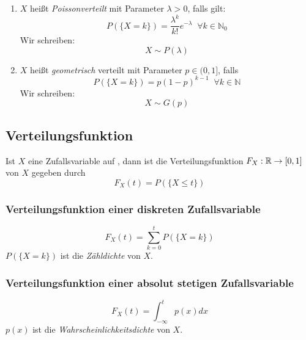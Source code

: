 \begin{enumerate}
    \item $X$ heißt \emph{Poissonverteilt} mit Parameter $\lambda > 0$, falls gilt:
          \begin{equation*}
              P(\{X=k\}) = \frac{\lambda^k}{k!} e^{-\lambda} \;\; \forall k\in \mathbb{N}_0
          \end{equation*}
          Wir schreiben:
          \begin{equation*}
              X \sim P(\lambda)
          \end{equation*}

    \item $X$ heißt \emph{geometrisch} verteilt mit Parameter $p \in (0,1]$, falls
          \begin{equation*}
              P(\{X=k\}) = p (1-p)^{k-1} \;\; \forall k \in \mathbb{N}
          \end{equation*}
          Wir schreiben:
          \begin{equation*}
              X \sim G(p)
          \end{equation*}
\end{enumerate}

\subsection{Verteilungsfunktion}

\begin{definition}[Verteilungsfunktion]
    Ist $X$ eine Zufallsvariable auf \wraum, dann ist die Verteilungsfunktion
    $F_X: \mathbb{R} \to [0,1]$ von $X$ gegeben durch
    \begin{equation*}
        F_X(t) = P(\{X \leq t\})
    \end{equation*}
\end{definition}

\subsubsection{Verteilungsfunktion einer diskreten Zufallsvariable}
\begin{equation*}
    F_X(t) = \sum_{k=0}^t P(\{X=k\})
\end{equation*}
$P(\{X=k\})$ ist die \emph{Zähldichte} von $X$.

\subsubsection{Verteilungsfunktion einer absolut stetigen Zufallsvariable}
\begin{equation*}
    F_X(t) = \int_{-\infty}^t p(x) dx
\end{equation*}
$p(x)$ ist die \emph{Wahrscheinlichkeitsdichte} von $X$.

